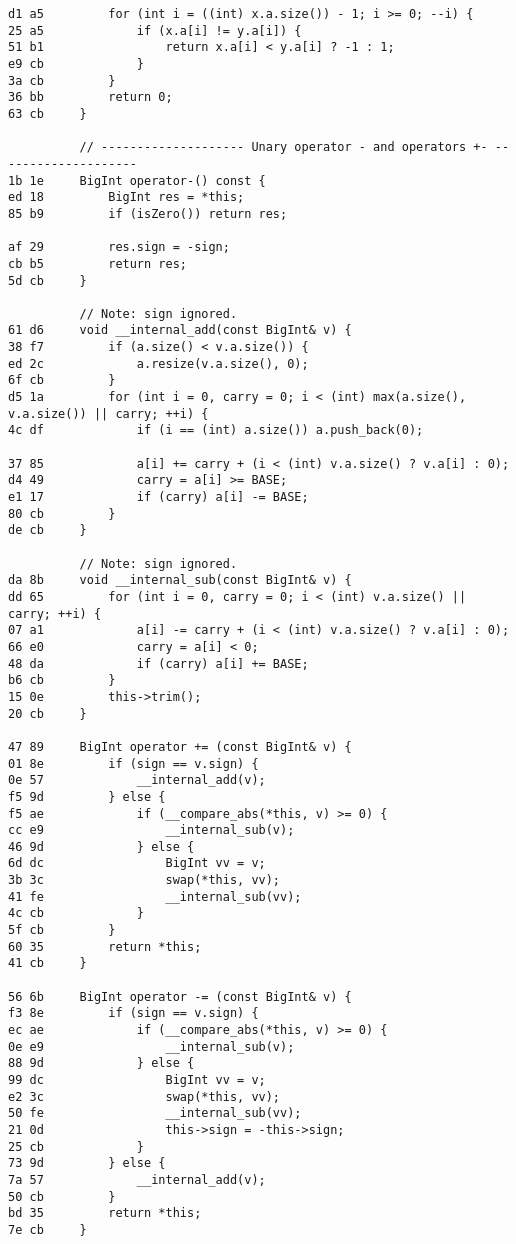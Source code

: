 \documentclass[11pt, a4paper, twoside]{article}
\begin{document}
\begin{lstlisting}
d1 a5         for (int i = ((int) x.a.size()) - 1; i >= 0; --i) {
25 a5             if (x.a[i] != y.a[i]) {
51 b1                 return x.a[i] < y.a[i] ? -1 : 1;
e9 cb             }
3a cb         }
36 bb         return 0;
63 cb     }
      
          // -------------------- Unary operator - and operators +- --------------------
1b 1e     BigInt operator-() const {
ed 18         BigInt res = *this;
85 b9         if (isZero()) return res;
      
af 29         res.sign = -sign;
cb b5         return res;
5d cb     }
      
          // Note: sign ignored.
61 d6     void __internal_add(const BigInt& v) {
38 f7         if (a.size() < v.a.size()) {
ed 2c             a.resize(v.a.size(), 0);
6f cb         }
d5 1a         for (int i = 0, carry = 0; i < (int) max(a.size(), v.a.size()) || carry; ++i) {
4c df             if (i == (int) a.size()) a.push_back(0);
      
37 85             a[i] += carry + (i < (int) v.a.size() ? v.a[i] : 0);
d4 49             carry = a[i] >= BASE;
e1 17             if (carry) a[i] -= BASE;
80 cb         }
de cb     }
      
          // Note: sign ignored.
da 8b     void __internal_sub(const BigInt& v) {
dd 65         for (int i = 0, carry = 0; i < (int) v.a.size() || carry; ++i) {
07 a1             a[i] -= carry + (i < (int) v.a.size() ? v.a[i] : 0);
66 e0             carry = a[i] < 0;
48 da             if (carry) a[i] += BASE;
b6 cb         }
15 0e         this->trim();
20 cb     }
      
47 89     BigInt operator += (const BigInt& v) {
01 8e         if (sign == v.sign) {
0e 57             __internal_add(v);
f5 9d         } else {
f5 ae             if (__compare_abs(*this, v) >= 0) {
cc e9                 __internal_sub(v);
46 9d             } else {
6d dc                 BigInt vv = v;
3b 3c                 swap(*this, vv);
41 fe                 __internal_sub(vv);
4c cb             }
5f cb         }
60 35         return *this;
41 cb     }
      
56 6b     BigInt operator -= (const BigInt& v) {
f3 8e         if (sign == v.sign) {
ec ae             if (__compare_abs(*this, v) >= 0) {
0e e9                 __internal_sub(v);
88 9d             } else {
99 dc                 BigInt vv = v;
e2 3c                 swap(*this, vv);
50 fe                 __internal_sub(vv);
21 0d                 this->sign = -this->sign;
25 cb             }
73 9d         } else {
7a 57             __internal_add(v);
50 cb         }
bd 35         return *this;
7e cb     }
      

\end{lstlisting}
\end{document}
